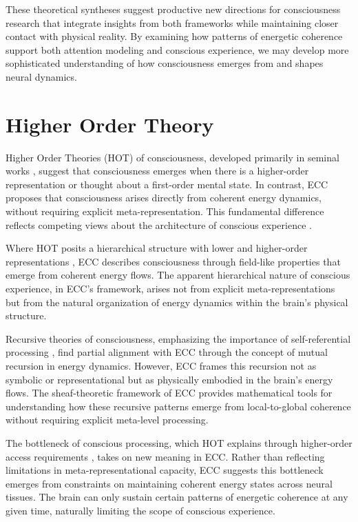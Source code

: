 \begin{refsection}
These theoretical syntheses suggest productive new directions for consciousness research that integrate insights from both frameworks while maintaining closer contact with physical reality. By examining how patterns of energetic coherence support both attention modeling and conscious experience, we may develop more sophisticated understanding of how consciousness emerges from and shapes neural dynamics.

\section{Higher Order Theory}

Higher Order Theories (HOT) of consciousness, developed primarily in seminal works \cite{Rosenthal2005, Armstrong1968}, suggest that consciousness emerges when there is a higher-order representation or thought about a first-order mental state. In contrast, ECC proposes that consciousness arises directly from coherent energy dynamics, without requiring explicit meta-representation. This fundamental difference reflects competing views about the architecture of conscious experience \cite{Lycan1996}.

Where HOT posits a hierarchical structure with lower and higher-order representations \cite{Carruthers2000}, ECC describes consciousness through field-like properties that emerge from coherent energy flows. The apparent hierarchical nature of conscious experience, in ECC's framework, arises not from explicit meta-representations but from the natural organization of energy dynamics within the brain's physical structure.

Recursive theories of consciousness, emphasizing the importance of self-referential processing \cite{Hofstadter2007}, find partial alignment with ECC through the concept of mutual recursion in energy dynamics. However, ECC frames this recursion not as symbolic or representational but as physically embodied in the brain's energy flows. The sheaf-theoretic framework of ECC provides mathematical tools for understanding how these recursive patterns emerge from local-to-global coherence without requiring explicit meta-level processing.

The bottleneck of conscious processing, which HOT explains through higher-order access requirements \cite{Lau2011}, takes on new meaning in ECC. Rather than reflecting limitations in meta-representational capacity, ECC suggests this bottleneck emerges from constraints on maintaining coherent energy states across neural tissues. The brain can only sustain certain patterns of energetic coherence at any given time, naturally limiting the scope of conscious experience.


\end{refsection}
